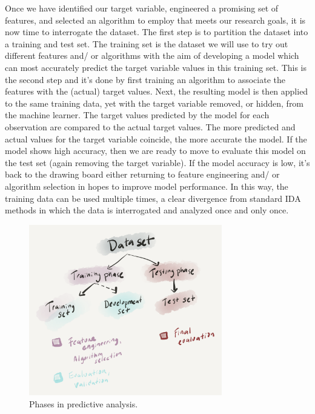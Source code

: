 \documentclass[
  letterpaper,
]{latex/krantz}
\begin{document}
Once we have identified our target variable, engineered a promising set
of features, and selected an algorithm to employ that meets our research
goals, it is now time to interrogate the dataset. The first step is to
partition the dataset into a training and test set. The training set is
the dataset we will use to try out different features and/ or algorithms
with the aim of developing a model which can most accurately predict the
target variable values in this training set. This is the second step and
it's done by first training an algorithm to associate the features with
the (actual) target values. Next, the resulting model is then applied to
the same training data, yet with the target variable removed, or hidden,
from the machine learner. The target values predicted by the model for
each observation are compared to the actual target values. The more
predicted and actual values for the target variable coincide, the more
accurate the model. If the model shows high accuracy, then we are ready
to move to evaluate this model on the test set (again removing the
target variable). If the model accuracy is low, it's back to the drawing
board either returning to feature engineering and/ or algorithm
selection in hopes to improve model performance. In this way, the
training data can be used multiple times, a clear divergence from
standard IDA methods in which the data is interrogated and analyzed once
and only once.

\begin{figure}[h]

{\centering \includegraphics[width=0.75\textwidth,height=\textheight]{figures/approaching-analysis/predictive-phases.png}

}

\caption{\label{fig-aa-predictive-phases}Phases in predictive analysis.}

\end{figure}
\end{document}
